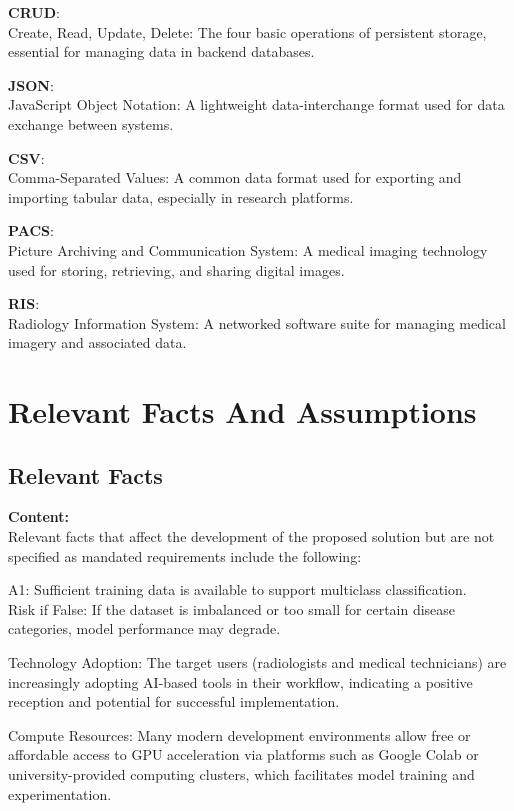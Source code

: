 \documentclass[12pt]{article}
\begin{document}
\textbf{CRUD}:\\
Create, Read, Update, Delete: The four basic operations of persistent storage, essential for managing data in backend databases.

\textbf{JSON}:\\
JavaScript Object Notation: A lightweight data-interchange format used for data exchange between systems.

\textbf{CSV}:\\
Comma-Separated Values: A common data format used for exporting and importing tabular data, especially in research platforms.

\textbf{PACS}:\\
Picture Archiving and Communication System: A medical imaging technology used for storing, retrieving, and sharing digital images.

\textbf{RIS}:\\
Radiology Information System: A networked software suite for managing medical imagery and associated data.

\section{Relevant Facts And Assumptions}


\subsection{Relevant Facts}

\textbf{Content:}\\
Relevant facts that affect the development of the proposed solution but are not specified as mandated requirements include the following:

A1: Sufficient training data is available to support multiclass classification.\\
Risk if False: If the dataset is imbalanced or too small for certain disease categories, model performance may degrade.

Technology Adoption: The target users (radiologists and medical technicians) are increasingly adopting AI-based tools in their workflow, indicating a positive reception and potential for successful implementation.

Compute Resources: Many modern development environments allow free or affordable access to GPU acceleration via platforms such as Google Colab or university-provided computing clusters, which facilitates model training and experimentation.
\end{document}
